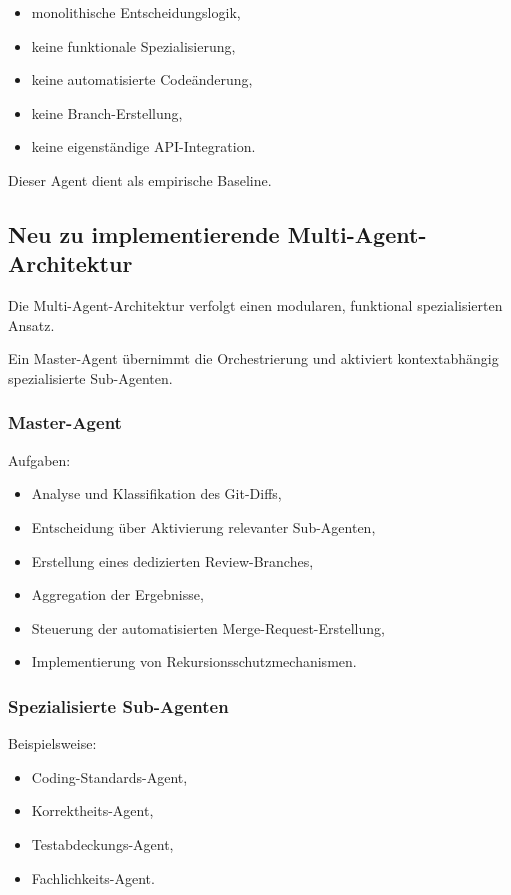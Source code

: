 \begin{itemize}
	\item monolithische Entscheidungslogik,
	\item keine funktionale Spezialisierung,
	\item keine automatisierte Codeänderung,
	\item keine Branch-Erstellung,
	\item keine eigenständige API-Integration.
\end{itemize}

Dieser Agent dient als empirische Baseline.



\subsection{Neu zu implementierende Multi-Agent-Architektur}

Die Multi-Agent-Architektur verfolgt einen modularen, funktional spezialisierten Ansatz.

Ein Master-Agent übernimmt die Orchestrierung und aktiviert kontextabhängig spezialisierte Sub-Agenten.

\subsubsection{Master-Agent}

Aufgaben:

\begin{itemize}
	\item Analyse und Klassifikation des Git-Diffs,
	\item Entscheidung über Aktivierung relevanter Sub-Agenten,
	\item Erstellung eines dedizierten Review-Branches,
	\item Aggregation der Ergebnisse,
	\item Steuerung der automatisierten Merge-Request-Erstellung,
	\item Implementierung von Rekursionsschutzmechanismen.
\end{itemize}

\subsubsection{Spezialisierte Sub-Agenten}

Beispielsweise:

\begin{itemize}
	\item Coding-Standards-Agent,
	\item Korrektheits-Agent,
	\item Testabdeckungs-Agent,
	\item Fachlichkeits-Agent.
\end{itemize}

